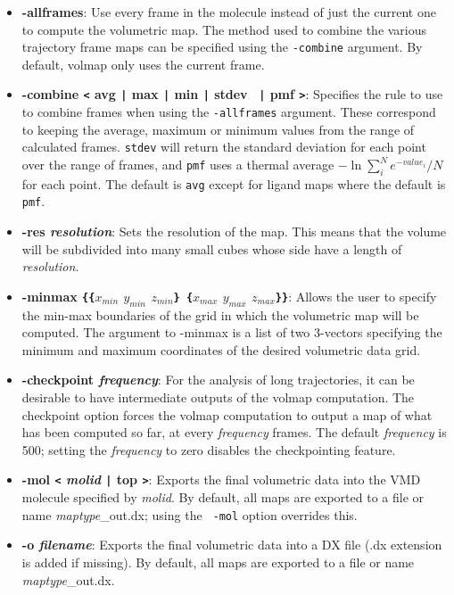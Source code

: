 \begin{itemize} 

  \item {\bf -allframes}: Use every frame in the molecule instead of just the
  current one to compute the volumetric map. The method used to combine the
  various trajectory frame maps can be specified using the {\tt -combine}
  argument. By default, volmap only uses the current frame.

  \item {\bf  -combine {\tt <} avg {\tt |} max {\tt |} min {\tt |} stdev {\tt
  |} pmf {\tt >}}: Specifies the rule to use to combine frames when using the
  {\tt -allframes} argument. These correspond to keeping the average, maximum or
  minimum values from the range of calculated frames. {\tt stdev} will return
  the standard deviation for each point over the range of frames, and {\tt pmf}
  uses a thermal average $-\ln \sum_i^N e^{-value_i}/N$ for each point. The
  default is {\tt avg} except for ligand maps where the default is {\tt pmf}.
  
  \item {\bf -res {\it resolution}}: Sets the resolution of the map. This means
  that the volume will be subdivided into many small cubes whose side have a
  length of {\it resolution}.
  
  \item {\bf -minmax {\tt \{\{}$x_{min}$ $y_{min}$ $z_{min}${\tt \} \{}$x_{max}$
$y_{max}$ $z_{max}${\tt \}\}}}: Allows the user to specify the min-max
boundaries of the grid in which the volumetric map will be computed. The
argument to -minmax is a list of two 3-vectors specifying the minimum and
maximum coordinates of the desired volumetric data grid.

  \item {\bf -checkpoint {\it frequency}}: For the analysis of
  long trajectories, it can be desirable to have intermediate outputs of the
  volmap computation. The checkpoint option forces the volmap computation to
  output a map of what has been computed so far, at every  {\it frequency}
  frames. The default {\it frequency} is 500; setting the {\it frequency} to
  zero disables the checkpointing feature.
  
  \item {\bf -mol {\tt <} {\it molid} {\tt |} top {\tt >}}: Exports the final
  volumetric data into the VMD molecule specified by {\it molid}. By default,
  all maps are exported to a file or name {\it maptype}\_out.dx; using the {\tt
  -mol} option overrides this.

  \item {\bf -o {\it filename}}: Exports the final volumetric data into a DX
  file (.dx extension is added if missing). By default, all maps are exported to
  a file or name {\it maptype}\_out.dx.
  
\end{itemize}  

